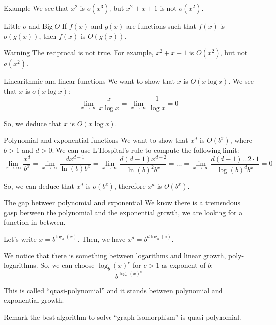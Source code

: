 \documentclass[a4paper]{article}
\begin{document}
\begin{parag}{Example}
    We see that $x^2$ is $o\left(x^3\right)$, but $x^2 + x + 1$ is not $o\left(x^2\right)$.
\end{parag}

\begin{parag}{Little-$o$ and Big-$O$}
    If $f\left(x\right)$ and $g\left(x\right)$ are functions such that $f\left(x\right)$ is $o\left(g\left(x\right)\right)$, then $f\left(x\right)$ is $O\left(g\left(x\right)\right)$.

    \begin{subparag}{Warning}
        The reciprocal is not true. For example, $x^2 + x + 1$ is $O\left(x^2\right)$, but not $o\left(x^2\right)$.
    \end{subparag}
\end{parag}

\begin{parag}{Linearithmic and linear functions}
    We want to show that $x$ is $O\left(x\log x\right)$. We see that $x$ is $o\left(x \log x\right)$:
    \[\lim_{x \to \infty} \frac{x}{x\log x} = \lim_{x \to \infty} \frac{1}{\log x} = 0\]

    So, we deduce that $x$ is $O\left(x\log x\right)$.
\end{parag}

\begin{parag}{Polynomial and exponential functions}
    We want to show that $x^d$ is $O\left(b^x\right)$, where $b > 1$ and $d > 0$. We can use L'Hospital's rule to compute the following limit:
    \[\lim_{x \to \infty} \frac{x^{d}}{b^{x}} = \lim_{x \to \infty} \frac{dx^{d-1}}{\ln\left(b\right)b^x} = \lim_{x \to \infty} \frac{d\left(d-1\right) x^{d-2}}{\ln\left(b\right)^2 b^x} = \ldots = \lim_{x \to \infty} \frac{d\left(d-1\right)\ldots2\cdot 1}{\log\left(b\right)^{d} b^{x}} = 0\]

    So, we can deduce that $x^{d}$ is $o\left(b^{x}\right)$, therefore $x^d$ is $O\left(b^x\right)$.
\end{parag}

\begin{parag}{The gap between polynomial and exponential}
    We know there is a tremendous gasp between the polynomial and the exponential growth, we are looking for a function in between.

    Let's write $x = b^{\log_b\left(x\right)}$. Then, we have $x^{d} = b^{d\log_b\left(x\right)}$.

    We notice that there is something between logarithms and linear growth, poly-logarithms. So, we can choose $\log_b\left(x\right)^c$ for $c > 1$ as exponent of $b$:
    \[b^{\log_b\left(x\right)^{c}}\]

    This is called ``quasi-polynomial'' and it stands between polynomial and exponential growth.

    \begin{subparag}{Remark}
        the best algorithm to solve ``graph isomorphism'' is quasi-polynomial.
    \end{subparag}
\end{parag}
\end{document}
